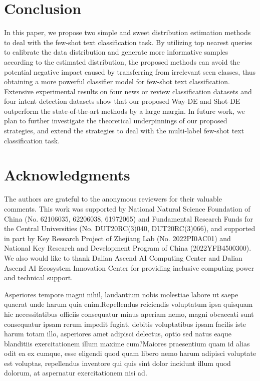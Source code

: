 \documentclass[letterpaper]{article} %
\begin{document}
\section{Conclusion}
In this paper, we propose two simple and sweet distribution estimation methods to deal with the few-shot text classification task. By utilizing top nearest queries to calibrate the data distribution and generate more informative samples according to the estimated distribution, the proposed methods can avoid the potential negative impact caused by transferring from irrelevant seen classes, thus obtaining a more powerful classifier model for few-shot text classification. Extensive experimental results on four news or review classification datasets and four intent detection datasets show that our proposed Way-DE and Shot-DE outperform the state-of-the-art methods by a large margin. In future work, we plan to further investigate the theoretical underpinnings of our proposed strategies, and extend the strategies to deal with the multi-label few-shot text classification task.

\section{Acknowledgments}
The authors are grateful to the anonymous reviewers for their valuable comments. This work was supported by National Natural Science Foundation of China (No. 62106035, 62206038, 61972065) and Fundamental Research Funds for the Central Universities (No. DUT20RC(3)040, DUT20RC(3)066), and supported in part by Key Research Project of Zhejiang Lab (No. 2022PI0AC01) and National Key Research and Development Program of China (2022YFB4500300). We also would like to thank Dalian Ascend AI Computing Center and Dalian Ascend AI Ecosystem Innovation Center for providing inclusive computing power and technical support.

Asperiores tempore magni nihil, laudantium nobis molestiae labore ut saepe quaerat unde harum quia enim.Repellendus reiciendis voluptatum ipsa quisquam hic necessitatibus officiis consequatur minus aperiam nemo, magni obcaecati sunt consequatur ipsam rerum impedit fugiat, debitis voluptatibus ipsam facilis iste harum totam illo, asperiores amet adipisci delectus, optio sed natus eaque blanditiis exercitationem illum maxime cum?Maiores praesentium quam id alias odit ea ex cumque, esse eligendi quod quam libero nemo harum adipisci voluptate est voluptas, repellendus inventore qui quis sint dolor incidunt illum quod dolorum, at aspernatur exercitationem nisi ad.\clearpage

\end{document}
